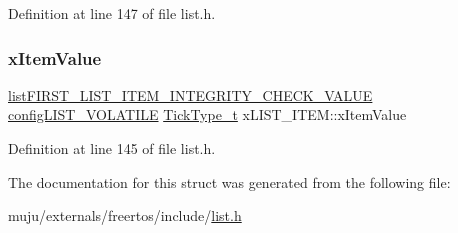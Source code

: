 Definition at line 147 of file list.\+h.

\mbox{\label{structx_l_i_s_t___i_t_e_m_a9b1f26de79f9da1403ca3ebc7a2e653a}} 
\subsubsection{\texorpdfstring{x\+Item\+Value}{xItemValue}}
{\footnotesize\ttfamily \hyperlink{vendor_2ceedling_2plugins_2freertos_2vendor_2freertos_2include_2list_8h_a3611bd5d5d87cb26ac1dc7a4852b94a0}{list\+F\+I\+R\+S\+T\+\_\+\+L\+I\+S\+T\+\_\+\+I\+T\+E\+M\+\_\+\+I\+N\+T\+E\+G\+R\+I\+T\+Y\+\_\+\+C\+H\+E\+C\+K\+\_\+\+V\+A\+L\+UE} \hyperlink{vendor_2ceedling_2plugins_2freertos_2vendor_2freertos_2include_2list_8h_a2d5de557c5561c8980d1bf51d87d8cba}{config\+L\+I\+S\+T\+\_\+\+V\+O\+L\+A\+T\+I\+LE} \hyperlink{externals_2freertos_2portable_2_g_c_c_2_a_r_m___c_m0_2portmacro_8h_aa69c48c6e902ce54f70886e6573c92a9}{Tick\+Type\+\_\+t} x\+L\+I\+S\+T\+\_\+\+I\+T\+E\+M\+::x\+Item\+Value}



Definition at line 145 of file list.\+h.



The documentation for this struct was generated from the following file\+:\begin{DoxyCompactItemize}
\item 
muju/externals/freertos/include/\hyperlink{externals_2freertos_2include_2list_8h}{list.\+h}\end{DoxyCompactItemize}
